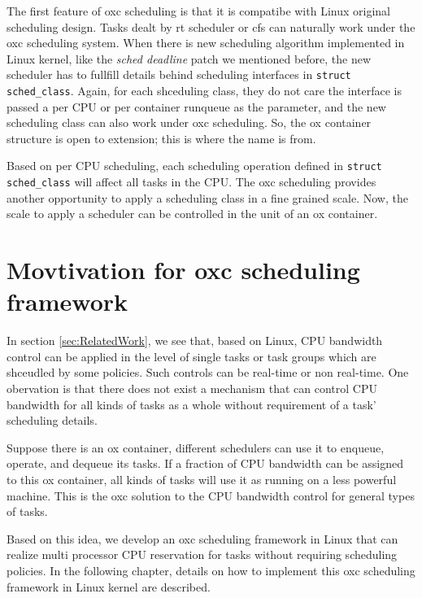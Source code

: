 The first feature of oxc scheduling is that it is compatibe with Linux original
scheduling design. Tasks dealt by rt scheduler or cfs can naturally work under the
oxc scheduling system. When there is new scheduling algorithm implemented in
Linux kernel, like the \emph{sched deadline} patch we mentioned before, the
new scheduler has to fullfill details behind scheduling interfaces in 
\texttt{struct sched\_class}. Again, for each shceduling class, they do not
care the interface is passed a per CPU or per container runqueue as the
parameter, and the new scheduling class can also work under oxc scheduling.
So, the ox container structure is open to extension; this is where the name
is from.

Based on per CPU scheduling, each scheduling operation defined in 
\texttt{struct sched\_class} will affect all tasks in the CPU. The
oxc scheduling provides another opportunity to apply a scheduling class in a 
fine grained scale. Now, the scale to apply a scheduler can be controlled 
in the unit of an ox container. 

\section{Movtivation for oxc scheduling framework}
In section \ref{sec:RelatedWork}, we see that, based on Linux, CPU bandwidth 
control can be applied in the level of single tasks or task groups which 
are shceudled by some policies. Such controls can be real-time or non real-time.
One obervation is that there does not exist a mechanism that can
control CPU bandwidth for all kinds of tasks as a whole without requirement of
a task' scheduling details. 

Suppose there is an ox container, different schedulers can use it to enqueue,
operate, and dequeue its tasks. If a fraction of CPU bandwidth can be assigned
to this ox container, all kinds of tasks will use it as running on a less powerful
machine. This is the oxc solution to the CPU bandwidth control for
general types of tasks.

Based on this idea, we develop an oxc scheduling framework in Linux that can 
realize multi processor CPU reservation for tasks without requiring scheduling
policies. 
In the following chapter, details on how to implement 
this oxc scheduling framework in Linux kernel are described.


